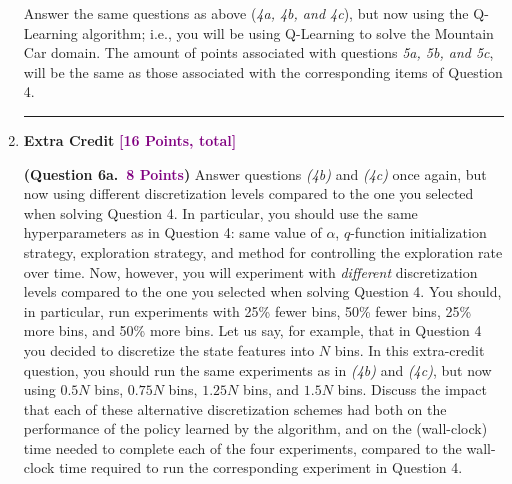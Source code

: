 \documentclass{article}
\newcommand{\POINTS}[1]{\textcolor{purple}{\textbf{{#1}}}}
\begin{document}
\begin{enumerate}
    
    Answer the same questions as above (\textit{4a, 4b, and 4c}), but now using the Q-Learning algorithm; i.e., you will be using Q-Learning to solve the Mountain Car domain. The amount of points associated with questions \textit{5a, 5b, and 5c}, will be the same as those associated with the corresponding items of Question 4.


\newpage
\vspace{0.5cm}
\noindent\rule{\textwidth}{1pt}
\vspace{0.25cm}

\item {\Large{\textbf{Extra Credit} \POINTS{[16 Points, total]}}} 
\vspace{0.25cm}

\textbf{(Question 6a.~\POINTS{8 Points})} Answer questions \textit{(4b)} and \textit{(4c)} once again, but now using different discretization levels compared to the one you selected when solving Question 4. In particular, you should use the same hyperparameters as in Question 4: same value of $\alpha$, $q$-function initialization strategy, exploration strategy, and method for controlling the exploration rate over time. Now, however, you will experiment with \textit{different} discretization levels compared to the one you selected when solving Question 4. You should, in particular, run experiments with 25\% fewer bins, 50\% fewer bins, 25\% more bins, and 50\% more bins. Let us say, for example, that in Question 4 you decided to discretize the state features into $N$ bins. In this extra-credit question, you should run the same  experiments as in \textit{(4b)} and \textit{(4c)}, but now using $0.5N$ bins, $0.75N$ bins, $1.25N$ bins, and $1.5N$ bins. Discuss the impact that each of these alternative discretization schemes had both on the performance of the policy learned by the algorithm, and on the (wall-clock) time needed to complete each of the four experiments, compared to the wall-clock time required to run the corresponding experiment in Question 4.




\end{enumerate}
\end{document}
